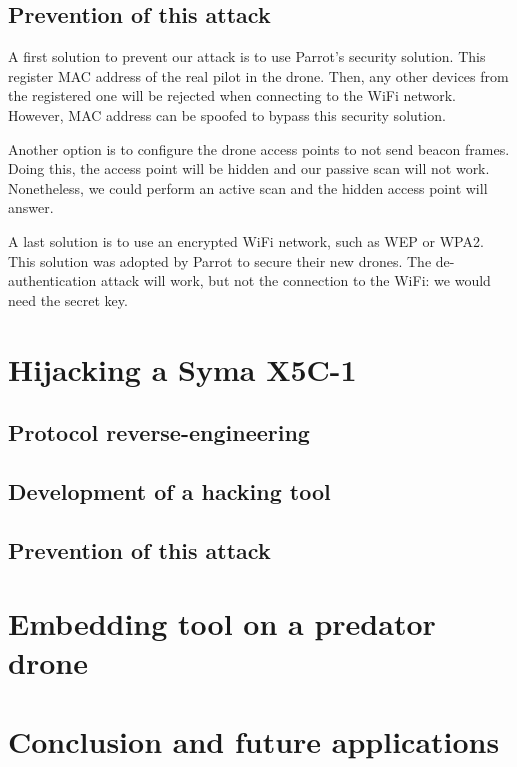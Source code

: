 \documentclass[conference,a4paper]{IEEEtran}
\begin{document}
\subsection{Prevention of this attack}
A first solution to prevent our attack is to use Parrot's security solution. This
register MAC address of the real pilot in the drone. Then, any other devices from the
registered one will be rejected when connecting to the WiFi network. However, MAC address
can be spoofed to bypass this security solution.

Another option is to configure the drone access points to not send beacon frames. Doing
this, the access point will be hidden and our passive scan will not work. Nonetheless, we
could perform an active scan and the hidden access point will answer.

A last solution is to use an encrypted WiFi network, such as WEP or WPA2. This solution
was adopted by Parrot to secure their new drones. The de-authentication attack will work,
but not the connection to the WiFi: we would need the secret key.



\section{Hijacking a Syma X5C-1}

\subsection{Protocol reverse-engineering}

\subsection{Development of a hacking tool}

\subsection{Prevention of this attack}



\section{Embedding tool on a predator drone}



\section{Conclusion and future applications}
\end{document}
